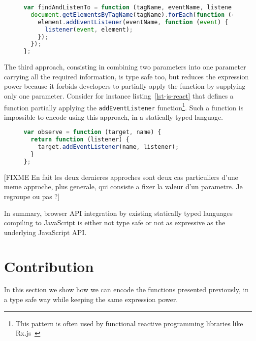 \documentclass{llncs}
\newcommand{\jscode}[1]{\lstinline[language=JavaScript]|#1|}
\begin{document}
\begin{figure}
\begin{lstlisting}[label=lst-js-comb,language=JavaScript,caption={Combination of use of \jscode{getElementsByTagName} and \jscode{addEventListener}}]
var findAndListenTo = function (tagName, eventName, listener) {
  document.getElementsByTagName(tagName).forEach(function (element) {
    element.addEventListener(eventName, function (event) {
      listener(event, element);
    });
  });
};
\end{lstlisting}
\end{figure}

The third approach, consisting in combining two parameters into one parameter carrying all the required information, is type safe too, but reduces the expression power because it forbids developers to partially apply the function by supplying only one parameter. Consider for instance listing~\ref{lst-js-react} that defines a function partially applying the \jscode{addEventListener} function\footnote{This pattern is often used by functional reactive programming libraries like Rx.js~\cite{liberty2011reactive}}. Such a function is impossible to encode using this approach, in a statically typed language.

\begin{figure}
\begin{lstlisting}[label=lst-js-react,language=JavaScript,caption={Partial application of \jscode{addEventListener} parameters}]
var observe = function (target, name) {
  return function (listener) {
    target.addEventListener(name, listener);
  }
};
\end{lstlisting}
\end{figure}

[FIXME En fait les deux dernieres approches sont deux cas particuliers d'une meme approche, plus generale, qui consiste a fixer la valeur d'un parametre. Je regroupe ou pas ?]

In summary, browser API integration by existing statically typed languages compiling to JavaScript is either not type safe or not as expressive as the underlying JavaScript API.

\section{Contribution}
\label{sec-contribution}

In this section we show how we can encode the functions presented previously, in a type safe way while keeping the same expression power.
\end{document}
